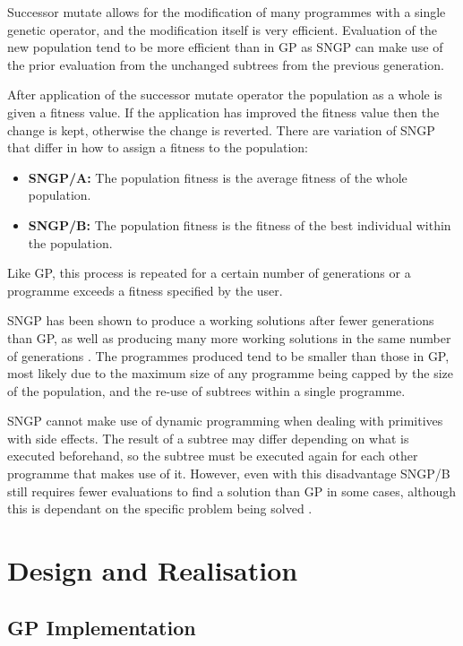 \documentclass{article}
\begin{document}
			Successor mutate allows for the modification of many programmes with a single genetic operator, and the modification itself is very efficient. Evaluation of the new population tend to be more efficient than in GP as SNGP can make use of the prior evaluation from the unchanged subtrees from the previous generation.
			
			After application of the successor mutate operator the population as a whole is given a fitness value. If the application has improved the fitness value then the change is kept, otherwise the change is reverted. There are variation of SNGP that differ in how to assign a fitness to the population:
			
			\begin{itemize}
				\item \textbf{SNGP/A:} The population fitness is the average fitness of the whole population.
				
				\item \textbf{SNGP/B:} The population fitness is the fitness of the best individual within the population.
			\end{itemize} 
		 
		 	Like GP, this process is repeated for a certain number of generations or a programme exceeds a fitness specified by the user.
		 	
		 	SNGP has been shown to produce a working solutions after fewer generations than GP, as well as producing many more working solutions in the same number of generations \cite{jackson_new_2012}. The programmes produced tend to be smaller than those in GP, most likely due to the maximum size of any programme being capped by the size of the population, and the re-use of subtrees within a single programme.
		 	
		 	SNGP cannot make use of dynamic programming when dealing with primitives with side effects. The result of a subtree may differ depending on what is executed beforehand, so the subtree must be executed again for each other programme that makes use of it. However, even with this disadvantage SNGP/B still requires fewer evaluations to find a solution than GP in some cases, although this is dependant on the specific problem being solved \cite{jackson_single_2012}.
	
	\section{Design and Realisation}
	
		\subsection{GP Implementation}
		
\end{document}
